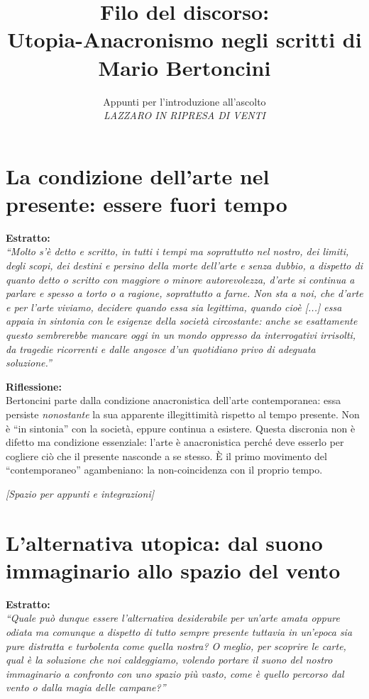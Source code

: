 \documentclass[12pt,a4paper]{article}
\title{\textbf{Filo del discorso:}\\ \large Utopia-Anacronismo negli scritti di Mario Bertoncini}
\author{Appunti per l'introduzione all'ascolto\\ \textit{LAZZARO IN RIPRESA DI VENTI}}
\date{}
\begin{document}
\maketitle

\section{La condizione dell'arte nel presente: essere fuori tempo}

\begin{estratto}
\textbf{Estratto:} \\
\textit{``Molto s'è detto e scritto, in tutti i tempi ma soprattutto nel nostro, dei limiti, degli scopi, dei destini e persino della morte dell'arte e senza dubbio, a dispetto di quanto detto o scritto con maggiore o minore autorevolezza, d'arte si continua a parlare e spesso a torto o a ragione, soprattutto a farne. Non sta a noi, che d'arte e per l'arte viviamo, decidere quando essa sia legittima, quando cioè [...] essa appaia in sintonia con le esigenze della società circostante: anche se esattamente questo sembrerebbe mancare oggi in un mondo oppresso da interrogativi irrisolti, da tragedie ricorrenti e dalle angosce d'un quotidiano privo di adeguata soluzione.''}
\end{estratto}

\begin{riflessione}
\textbf{Riflessione:} \\
Bertoncini parte dalla condizione anacronistica dell'arte contemporanea: essa persiste \textit{nonostante} la sua apparente illegittimità rispetto al tempo presente. Non è ``in sintonia'' con la società, eppure continua a esistere. Questa discronia non è difetto ma condizione essenziale: l'arte è anacronistica perché deve esserlo per cogliere ciò che il presente nasconde a se stesso. È il primo movimento del ``contemporaneo'' agambeniano: la non-coincidenza con il proprio tempo.

\vspace{0.5cm}
\textit{[Spazio per appunti e integrazioni]}
\vspace{1cm}
\end{riflessione}

\section{L'alternativa utopica: dal suono immaginario allo spazio del vento}

\begin{estratto}
\textbf{Estratto:} \\
\textit{``Quale può dunque essere l'alternativa desiderabile per un'arte amata oppure odiata ma comunque a dispetto di tutto sempre presente tuttavia in un'epoca sia pure distratta e turbolenta come quella nostra? O meglio, per scoprire le carte, qual è la soluzione che noi caldeggiamo, volendo portare il suono del nostro immaginario a confronto con uno spazio più vasto, come è quello percorso dal vento o dalla magia delle campane?''}
\end{estratto}
\end{document}
